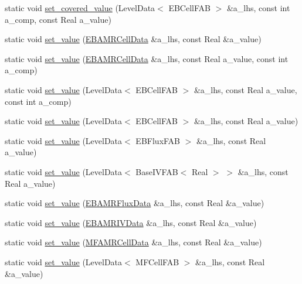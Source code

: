 \begin{DoxyCompactItemize}
static void \hyperlink{classdata__ops_a8606ac91b9c88b2d84fff72f9e4a3511}{set\+\_\+covered\+\_\+value} (Level\+Data$<$ E\+B\+Cell\+F\+AB $>$ \&a\+\_\+lhs, const int a\+\_\+comp, const Real a\+\_\+value)
\item 
static void \hyperlink{classdata__ops_a4568479c4afad6d6967a1095c2e8ac9b}{set\+\_\+value} (\hyperlink{type__definitions_8H_a7e610f301989e5e07781c5e338bdb7c3}{E\+B\+A\+M\+R\+Cell\+Data} \&a\+\_\+lhs, const Real \&a\+\_\+value)
\item 
static void \hyperlink{classdata__ops_a97424d37f0c57f7241b3e7009113c026}{set\+\_\+value} (\hyperlink{type__definitions_8H_a7e610f301989e5e07781c5e338bdb7c3}{E\+B\+A\+M\+R\+Cell\+Data} \&a\+\_\+lhs, const Real a\+\_\+value, const int a\+\_\+comp)
\item 
static void \hyperlink{classdata__ops_a9928cf0563c968b7f3849bcc6b7511c2}{set\+\_\+value} (Level\+Data$<$ E\+B\+Cell\+F\+AB $>$ \&a\+\_\+lhs, const Real a\+\_\+value, const int a\+\_\+comp)
\item 
static void \hyperlink{classdata__ops_a10bf7bbf5cfa495b16e7181c0e921199}{set\+\_\+value} (Level\+Data$<$ E\+B\+Cell\+F\+AB $>$ \&a\+\_\+lhs, const Real a\+\_\+value)
\item 
static void \hyperlink{classdata__ops_a6bbdf0931880a8ba602cf77531a254e4}{set\+\_\+value} (Level\+Data$<$ E\+B\+Flux\+F\+AB $>$ \&a\+\_\+lhs, const Real a\+\_\+value)
\item 
static void \hyperlink{classdata__ops_adfb79acb51bd18daea07d7303514d1ea}{set\+\_\+value} (Level\+Data$<$ Base\+I\+V\+F\+AB$<$ Real $>$ $>$ \&a\+\_\+lhs, const Real a\+\_\+value)
\item 
static void \hyperlink{classdata__ops_aa739a84309b60723d3cb53a1b49f3efa}{set\+\_\+value} (\hyperlink{type__definitions_8H_aadad278b2e5d3d4abcf9032f90ba78c3}{E\+B\+A\+M\+R\+Flux\+Data} \&a\+\_\+lhs, const Real \&a\+\_\+value)
\item 
static void \hyperlink{classdata__ops_acc3c5155ea37c67e12591a1d6cc8b660}{set\+\_\+value} (\hyperlink{type__definitions_8H_a6b8fa905d55cbb491b52180386f0e0c1}{E\+B\+A\+M\+R\+I\+V\+Data} \&a\+\_\+lhs, const Real \&a\+\_\+value)
\item 
static void \hyperlink{classdata__ops_aa6412ea37fbad7ed027e73ce6ca9f9da}{set\+\_\+value} (\hyperlink{type__definitions_8H_aced885351d40daa466564acbee4042d3}{M\+F\+A\+M\+R\+Cell\+Data} \&a\+\_\+lhs, const Real \&a\+\_\+value)
\item 
static void \hyperlink{classdata__ops_a9e6747927a737c87a86273ebde890da4}{set\+\_\+value} (Level\+Data$<$ M\+F\+Cell\+F\+AB $>$ \&a\+\_\+lhs, const Real \&a\+\_\+value)

\end{DoxyCompactItemize}
